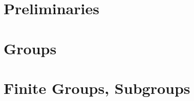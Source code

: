 \documentclass[12pt]{report}
\begin{document}
  

  \setcounter{chapter}{-1}

  \chapter{Preliminaries}
  


  \setcounter{chapter}{2}

  \chapter{Groups}
  

  \chapter{Finite Groups, Subgroups}
  
\end{document}
